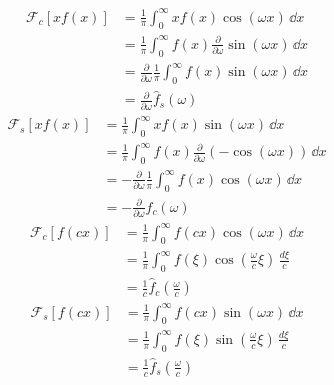 {%
\begin{Solution}
  \label{solution ode ft xf(x) f(cx)}
  \begin{align*}
    \mathcal{F}_c[x f(x)] &= \frac{1}{\pi} \int_0^\infty x f(x) \cos(\omega x)\,\dd x \\
    &= \frac{1}{\pi} \int_0^\infty f(x) \frac{\partial}{\partial \omega} \sin(\omega x)\,\dd x\\
    &= \frac{\partial}{\partial \omega} \frac{1}{\pi} \int_0^\infty f(x) \sin(\omega x)\,\dd x\\
    &= \frac{\partial}{\partial \omega} \hat{f}_s(\omega)
  \end{align*}
  \begin{align*}
    \mathcal{F}_s[x f(x)] &= \frac{1}{\pi} \int_0^\infty x f(x) \sin(\omega x)\,\dd x \\
    &= \frac{1}{\pi} \int_0^\infty f(x) \frac{\partial}{\partial \omega}(-\cos(\omega x))\,\dd x\\
    &= -\frac{\partial}{\partial \omega} \frac{1}{\pi} \int_0^\infty f(x) \cos(\omega x)\,\dd x\\
    &= -\frac{\partial}{\partial \omega} \hat{f}_c(\omega)
  \end{align*}
  \begin{align*}
    \mathcal{F}_c[f(c x)] &= \frac{1}{\pi} \int_0^\infty f(c x) \cos(\omega x)\,\dd x \\
    &= \frac{1}{\pi} \int_0^\infty f(\xi) \cos\left(\frac{\omega}{c} \xi\right)\,
    \frac{d\xi}{c} \\
    &= \frac{1}{c} \hat{f}_c\left(\frac{\omega}{c}\right)
  \end{align*}
  \begin{align*}
    \mathcal{F}_s[f(c x)] &= \frac{1}{\pi} \int_0^\infty f(c x) \sin(\omega x)\,\dd x \\
    &= \frac{1}{\pi} \int_0^\infty f(\xi) \sin\left(\frac{\omega}{c} \xi\right)\,
    \frac{d\xi}{c} \\
    &= \frac{1}{c} \hat{f}_s\left(\frac{\omega}{c}\right)
  \end{align*}
\end{Solution}





}
